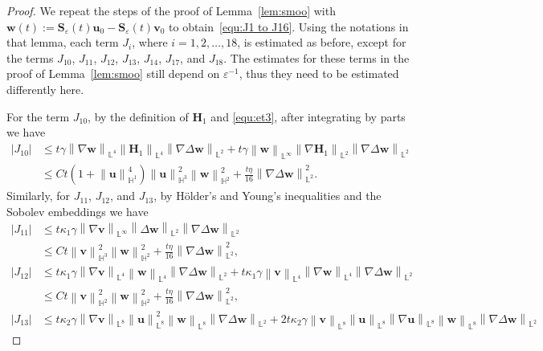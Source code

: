 \documentclass[11pt, reqno]{amsart}
\theoremstyle{definition}
\numberwithin{equation}{section}
\newcommand{\bff}{\boldsymbol}
\newcommand{\bb}{\mathbb}
\newcommand{\norm}[2]{\left\|{#1}\right\|_{#2}}
\newcommand{\abs}[1]{\left|{#1}\right|}
\begin{document}
\begin{proof}
We repeat the steps of the proof of Lemma~\ref{lem:smoo} with $\bff{w}(t):=\bff{S}_\varepsilon(t) \bff{u}_0 - \bff{S}_\varepsilon(t) \bff{v}_0$ to obtain~\eqref{equ:J1 to J16}. Using the notations in that lemma, each term $J_i$, where $i=1,2,\ldots,18$, is estimated as before, except for the terms $J_{10}$, $J_{11}$, $J_{12}$, $J_{13}$, $J_{14}$, $J_{17}$, and $J_{18}$. The estimates for these terms in the proof of Lemma~\ref{lem:smoo} still depend on $\varepsilon^{-1}$, thus they need to be estimated differently here. 

For the term $J_{10}$, by the definition of $\bff{H}_1$ and \eqref{equ:et3}, after integrating by parts we have
\begin{align*}
    \abs{J_{10}}
    &\leq
    t\gamma \norm{\nabla \bff{w}}{\bb{L}^4} \norm{\bff{H}_1}{\bb{L}^4} \norm{\nabla\Delta \bff{w}}{\bb{L}^2}
    +
    t\gamma \norm{\bff{w}}{\bb{L}^\infty} \norm{\nabla\bff{H}_1}{\bb{L}^2} \norm{\nabla\Delta \bff{w}}{\bb{L}^2}
    \\
    &\leq
    Ct \left(1+\norm{\bff{u}}{\bb{H}^1}^4\right) \norm{\bff{u}}{\bb{H}^3}^2 \norm{\bff{w}}{\bb{H}^2}^2
    +
    \frac{t\eta}{16} \norm{\nabla \Delta \bff{w}}{\bb{L}^2}^2.
\end{align*}
Similarly, for $J_{11}$, $J_{12}$, and $J_{13}$, by H\"older's and Young's inequalities and the Sobolev embeddings we have
\begin{align*}
    \abs{J_{11}}
    &\leq
    t\kappa_1 \gamma \norm{\nabla \bff{v}}{\bb{L}^\infty} \norm{\Delta \bff{w}}{\bb{L}^2} \norm{\nabla\Delta\bff{w}}{\bb{L}^2}
    \\
    &\leq
    Ct \norm{\bff{v}}{\bb{H}^3}^2 \norm{\bff{w}}{\bb{H}^2}^2 +
    \frac{t\eta}{16} \norm{\nabla \Delta \bff{w}}{\bb{L}^2}^2,
    \\
    \abs{J_{12}}
    &\leq
    t\kappa_1 \gamma \norm{\nabla \bff{v}}{\bb{L}^4} \norm{\bff{w}}{\bb{L}^4} \norm{\nabla\Delta \bff{w}}{\bb{L}^2}
    +
    t\kappa_1 \gamma \norm{\bff{v}}{\bb{L}^4} \norm{\nabla\bff{w}}{\bb{L}^4} \norm{\nabla\Delta \bff{w}}{\bb{L}^2}
    \\
    &\leq
    Ct \norm{\bff{v}}{\bb{H}^2}^2 \norm{\bff{w}}{\bb{H}^2}^2
    +
    \frac{t\eta}{16} \norm{\nabla \Delta \bff{w}}{\bb{L}^2}^2,
    \\
    \abs{J_{13}}
    &\leq
    t\kappa_2 \gamma \norm{\nabla \bff{v}}{\bb{L}^8} \norm{\bff{u}}{\bb{L}^8}^2 \norm{\bff{w}}{\bb{L}^8} \norm{\nabla\Delta \bff{w}}{\bb{L}^2}
    +
    2t\kappa_2 \gamma \norm{\bff{v}}{\bb{L}^8} \norm{\bff{u}}{\bb{L}^8} \norm{\nabla\bff{u}}{\bb{L}^8} \norm{\bff{w}}{\bb{L}^8} \norm{\nabla\Delta \bff{w}}{\bb{L}^2}

\end{align*}
\end{proof}
\end{document}
